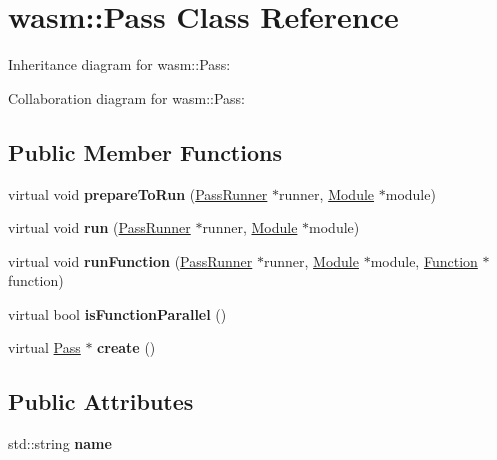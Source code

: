 \hypertarget{classwasm_1_1_pass}{}\section{wasm\+:\+:Pass Class Reference}
\label{classwasm_1_1_pass}


Inheritance diagram for wasm\+:\+:Pass\+:


Collaboration diagram for wasm\+:\+:Pass\+:
\subsection*{Public Member Functions}
\begin{DoxyCompactItemize}
\item 
\mbox{\label{classwasm_1_1_pass_a542f08f604dd67b50eac83d2c4aeeec2}} 
virtual void {\bfseries prepare\+To\+Run} (\mbox{\hyperlink{structwasm_1_1_pass_runner}{Pass\+Runner}} $\ast$runner, \mbox{\hyperlink{classwasm_1_1_module}{Module}} $\ast$module)
\item 
\mbox{\label{classwasm_1_1_pass_a98af4d3c09048512456302903fadf166}} 
virtual void {\bfseries run} (\mbox{\hyperlink{structwasm_1_1_pass_runner}{Pass\+Runner}} $\ast$runner, \mbox{\hyperlink{classwasm_1_1_module}{Module}} $\ast$module)
\item 
\mbox{\label{classwasm_1_1_pass_a9e0b46cf6264a3b603fa1fabe1f33b92}} 
virtual void {\bfseries run\+Function} (\mbox{\hyperlink{structwasm_1_1_pass_runner}{Pass\+Runner}} $\ast$runner, \mbox{\hyperlink{classwasm_1_1_module}{Module}} $\ast$module, \mbox{\hyperlink{classwasm_1_1_function}{Function}} $\ast$function)
\item 
\mbox{\label{classwasm_1_1_pass_a3c0e28872643033778f43bb3f2244ce6}} 
virtual bool {\bfseries is\+Function\+Parallel} ()
\item 
\mbox{\label{classwasm_1_1_pass_ad7270a2f0969ade9f720d5dc30e9af65}} 
virtual \mbox{\hyperlink{classwasm_1_1_pass}{Pass}} $\ast$ {\bfseries create} ()
\end{DoxyCompactItemize}
\subsection*{Public Attributes}
\begin{DoxyCompactItemize}
\item 
\mbox{\label{classwasm_1_1_pass_ac5b25923e57ee588b1381753a27b8ab5}} 
std\+::string {\bfseries name}
\end{DoxyCompactItemize}
